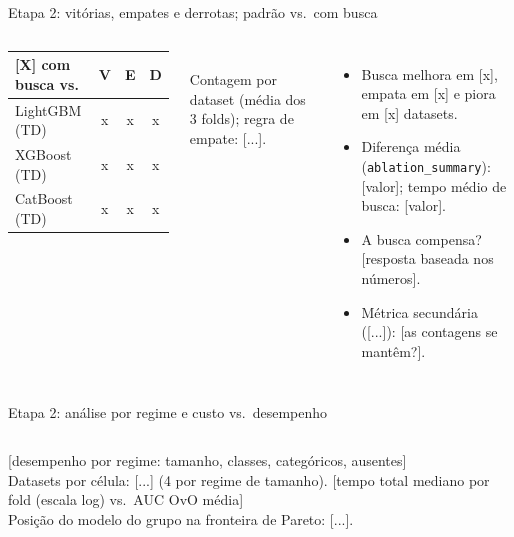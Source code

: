\documentclass[aspectratio=169,11pt]{beamer}
\begin{document}
\begin{frame}{Etapa 2: vitórias, empates e derrotas; padrão vs.\ com busca}
    \begin{columns}[T,onlytextwidth]
        \footnotesize
        \begin{tabular}{l c c c}
            \toprule
            \textbf{[X] com busca vs.} & \textbf{V} & \textbf{E} & \textbf{D} \\
            \midrule
            LightGBM (TD) & x & x & x \\
            XGBoost (TD)  & x & x & x \\
            CatBoost (TD) & x & x & x \\
            \bottomrule
        \end{tabular}
        \\[0.3em]
        Contagem por dataset (média dos 3 folds); regra de empate: [...].
        \footnotesize
        \begin{itemize}
            \item Busca melhora em [x], empata em [x] e piora em [x] datasets.
            \item Diferença média (\texttt{ablation\_summary}): [valor]; tempo médio de busca: [valor].
            \item A busca compensa? [resposta baseada nos números].
            \item Métrica secundária ([...]): [as contagens se mantêm?].
        \end{itemize}
    \end{columns}
\end{frame}

\begin{frame}{Etapa 2: análise por regime e custo vs.\ desempenho}
    \begin{columns}[T,onlytextwidth]
        \centering
        [desempenho por regime: tamanho, classes, categóricos, ausentes]
        \\[0.3em]
        \footnotesize Datasets por célula: [...] (4 por regime de tamanho).
        \centering
        [tempo total mediano por fold (escala log) vs.\ AUC OvO média]
        \\[0.3em]
        \footnotesize Posição do modelo do grupo na fronteira de Pareto: [...].
    \end{columns}
\end{frame}
\end{document}
